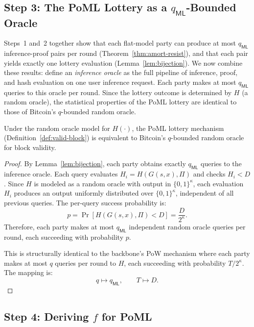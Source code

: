 \subsection{Step 3: The PoML Lottery as a $q_\mathsf{ML}$-Bounded Oracle}

Steps~1 and~2 together show that each flat-model party can produce at most $q_{\mathsf{ML}}$ inference-proof pairs per round (Theorem~\ref{thm:amort-resist}), and that each pair yields exactly one lottery evaluation (Lemma~\ref{lem:bijection}). We now combine these results: define an \emph{inference oracle} as the full pipeline of inference, proof, and hash evaluation on one user inference request. Each party makes at most $q_{\mathsf{ML}}$ queries to this oracle per round. Since the lottery outcome is determined by $H$ (a random oracle), the statistical properties of the PoML lottery are identical to those of Bitcoin's $q$-bounded random oracle.

\begin{lemma}
\label{lem:lottery-equiv}
Under the random oracle model for $H(\cdot)$, the PoML lottery mechanism (Definition~\ref{def:valid-block}) is equivalent to Bitcoin's $q$-bounded random oracle for block validity.
\end{lemma}

\begin{proof}
By Lemma~\ref{lem:bijection}, each party obtains exactly $q_{\mathsf{ML}}$ queries to the inference oracle. Each query evaluates $H_i = H(G(s,x), \Pi)$ and checks $H_i < D$. Since $H$ is modeled as a random oracle with output in $\{0,1\}^\kappa$, each evaluation $H_i$ produces an output uniformly distributed over $\{0,1\}^\kappa$, independent of all previous queries. The per-query success probability is:
\[
    p = \Pr[H(G(s,x), \Pi) < D] = \frac{D}{2^{\kappa}}.
\]
Therefore, each party makes at most $q_{\mathsf{ML}}$ independent random oracle queries per round, each succeeding with probability $p$.

This is structurally identical to the backbone's PoW mechanism where each party makes at most $q$ queries per round to $H$, each succeeding with probability $T / 2^\kappa$. The mapping is:
\[
    q \mapsto q_{\mathsf{ML}}, \qquad T \mapsto D.
\]
\end{proof}


\subsection{Step 4: Deriving $f$ for PoML}

